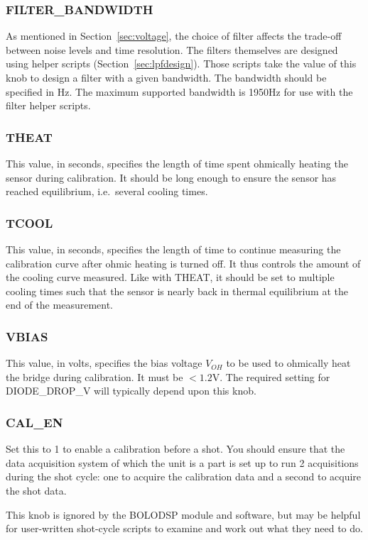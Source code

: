 \documentclass[12pt,a4paper]{article}
\begin{document}
\subsubsection{FILTER{\_}BANDWIDTH}
As mentioned in Section~\ref{sec:voltage}, the choice of filter affects the trade-off between noise levels and time resolution. The filters themselves are
designed using helper scripts (Section~\ref{sec:lpfdesign}). Those scripts take the value of this knob to design a filter with a given bandwidth. The
bandwidth should be specified in Hz. The maximum supported bandwidth is 1950Hz for use with the filter helper scripts.

\subsubsection{THEAT}
This value, in seconds, specifies the length of time spent ohmically heating the sensor during calibration. It should be long enough to ensure the sensor
has reached equilibrium, i.e.~several cooling times.

\subsubsection{TCOOL}
This value, in seconds, specifies the length of time to continue measuring the calibration curve after ohmic heating is turned off. It thus controls the
amount of the cooling curve measured. Like with THEAT, it should be set to multiple cooling times such that the sensor is nearly back in thermal
equilibrium at the end of the measurement.

\subsubsection{VBIAS}
This value, in volts, specifies the bias voltage $V_{OH}$ to be used to ohmically heat the bridge during calibration. It must be $<1.2\mathrm{V}$. The
required setting for DIODE{\_}DROP{\_}V will typically depend upon this knob.

\subsubsection{CAL{\_}EN}
Set this to 1 to enable a calibration before a shot. You should ensure that the data acquisition system of which the unit is a part is set up to run 2
acquisitions during the shot cycle: one to acquire the calibration data and a second to acquire the shot data.

This knob is ignored by the BOLODSP module and software, but may be helpful for user-written shot-cycle scripts to examine and work out what they need to
do.
\end{document}
